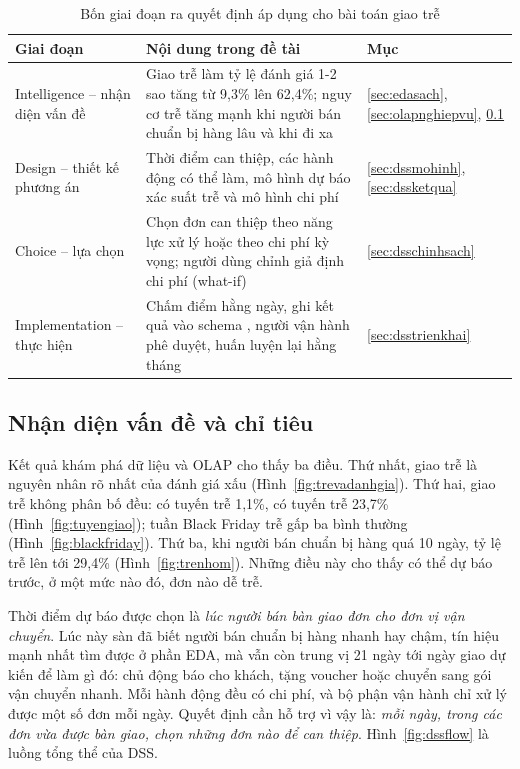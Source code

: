 \begin{table}[H]
\centering
\small{}
\caption{Bốn giai đoạn ra quyết định áp dụng cho bài toán giao trễ}
\label{tab:simon}
\begin{tabularx}{\linewidth}{|P{2.9cm}|>{\raggedright\arraybackslash}X|P{3.0cm}|}
\hline
\textbf{Giai đoạn} & \textbf{Nội dung trong đề tài} & \textbf{Mục}\\ \hline
Intelligence -- nhận diện vấn đề & Giao trễ làm tỷ lệ đánh giá 1-2 sao tăng từ 9,3\% lên 62,4\%; nguy cơ trễ tăng mạnh khi người bán chuẩn bị hàng lâu và khi đi xa & \ref{sec:edasach}, \ref{sec:olapnghiepvu}, \ref{sec:dssvande}\\ \hline
Design -- thiết kế phương án & Thời điểm can thiệp, các hành động có thể làm, mô hình dự báo xác suất trễ và mô hình chi phí & \ref{sec:dssmohinh}, \ref{sec:dssketqua}\\ \hline
Choice -- lựa chọn & Chọn đơn can thiệp theo năng lực xử lý hoặc theo chi phí kỳ vọng; người dùng chỉnh giả định chi phí (what-if) & \ref{sec:dsschinhsach}\\ \hline
Implementation -- thực hiện & Chấm điểm hằng ngày, ghi kết quả vào schema , người vận hành phê duyệt, huấn luyện lại hằng tháng & \ref{sec:dsstrienkhai}\\ \hline
\end{tabularx}
\end{table}

\subsection{Nhận diện vấn đề và chỉ tiêu}\label{sec:dssvande}

Kết quả khám phá dữ liệu và OLAP cho thấy ba điều. Thứ nhất, giao trễ là nguyên nhân rõ nhất của đánh giá xấu (Hình~\ref{fig:trevadanhgia}). Thứ hai, giao trễ không phân bố đều: có tuyến trễ 1,1\%, có tuyến trễ 23,7\% (Hình~\ref{fig:tuyengiao}); tuần Black Friday trễ gấp ba bình thường (Hình~\ref{fig:blackfriday}). Thứ ba, khi người bán chuẩn bị hàng quá 10 ngày, tỷ lệ trễ lên tới 29,4\% (Hình~\ref{fig:trenhom}). Những điều này cho thấy có thể dự báo trước, ở một mức nào đó, đơn nào dễ trễ.

Thời điểm dự báo được chọn là \textit{lúc người bán bàn giao đơn cho đơn vị vận chuyển}. Lúc này sàn đã biết người bán chuẩn bị hàng nhanh hay chậm, tín hiệu mạnh nhất tìm được ở phần EDA, mà vẫn còn trung vị 21 ngày tới ngày giao dự kiến để làm gì đó: chủ động báo cho khách, tặng voucher hoặc chuyển sang gói vận chuyển nhanh. Mỗi hành động đều có chi phí, và bộ phận vận hành chỉ xử lý được một số đơn mỗi ngày. Quyết định cần hỗ trợ vì vậy là: \textit{mỗi ngày, trong các đơn vừa được bàn giao, chọn những đơn nào để can thiệp}. Hình~\ref{fig:dssflow} là luồng tổng thể của DSS.

